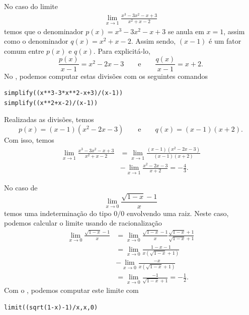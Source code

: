 \begin{ex}
  No caso do limite
  \begin{align}
    \lim_{x\to 1} \frac{x^3-3x^2-x+3}{x^2+x-2}
  \end{align}
  temos que o denominador $p(x) = x^3-3x^2-x+3$ se anula em $x=1$, assim como o denominador $q(x) = x^2+x-2$. Assim sendo, $(x-1)$ é um fator comum entre $p(x)$ e $q(x)$. Para explicitá-lo, 
  \begin{equation}
    \frac{p(x)}{x-1} = x^2-2x-3\qquad\text{e}\qquad\frac{q(x)}{x-1} = x+2.
  \end{equation}
  \ifispython
  No \sympy, podemos computar estas divisões com os seguintes comandos
\begin{verbatim}
simplify((x**3-3*x**2-x+3)/(x-1))
simplify((x**2+x-2)/(x-1))
\end{verbatim}
  \fi
  Realizadas as divisões, temos
  \begin{equation}
    p(x) = (x-1)(x^2-2x-3)\qquad\text{e}\qquad q(x)=(x-1)(x+2).
  \end{equation}
  Com isso, temos
  \begin{align}
    \lim_{x\to 1} \frac{x^3-3x^2-x+3}{x^2+x-2} &= \lim_{x\to 1} \frac{(x-1)(x^2-2x-3)}{(x-1)(x+2)} \\
    &- \lim_{x\to 1} \frac{x^2-2x-3}{x+2} = -\frac{4}{3}.
  \end{align}
\end{ex}

\begin{ex}
  No caso de
  \begin{equation}
    \lim_{x\to 0} \frac{\sqrt{1-x}-1}{x}
  \end{equation}
  temos uma indeterminação do tipo $0/0$ envolvendo uma raiz. Neste caso, podemos calcular o limite usando de racionalização
  \begin{align}
    \lim_{x\to 0} \frac{\sqrt{1-x}-1}{x} &= \lim_{x\to 0} \frac{\sqrt{1-x}-1}{x}\frac{\sqrt{1-x}+1}{\sqrt{1-x}+1}\\
                                         &= \lim_{x\to 0} \frac{1-x-1}{x(\sqrt{1-x}+1)} \\
                                         &- \lim_{x\to 0} \frac{-x}{x(\sqrt{1-x}+1)}\\
    &= \lim_{x\to 0} \frac{-1}{\sqrt{1-x}+1} = -\frac{1}{2}.
  \end{align}
  \ifispython
  Com o \sympy, podemos computar este limite com
\begin{verbatim}
limit((sqrt(1-x)-1)/x,x,0)
\end{verbatim}
  \fi
\end{ex}

